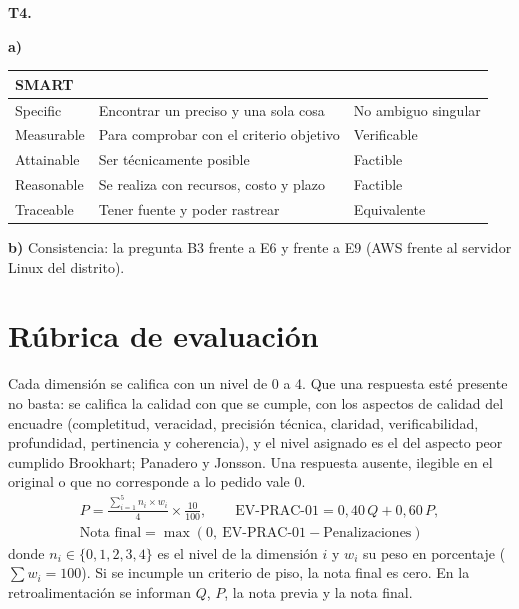 \documentclass[11pt]{article}
\newcommand{\seccion}[1]{\section{\textcolor{utegreendk}{#1}}}
\begin{document}
\begin{cajarespuesta}[title={Respuesta del estudiante: T4 (parte realizada)}]
	\textbf{T4.}
	
	\textbf{a)}
	
	\begin{longtable}{|p{2.5cm}|p{6cm}|p{4cm}|}
		\hline
		SMART & & \\ \hline
		Specific & Encontrar un preciso y una sola cosa & No ambiguo singular\\ \hline
		Measurable & Para comprobar con el criterio objetivo & Verificable\\ \hline
		Attainable & Ser técnicamente posible & Factible\\ \hline
		Reasonable & Se realiza con recursos, costo y plazo & Factible\\ \hline
		Traceable & Tener fuente y poder rastrear & Equivalente\\ \hline
	\end{longtable}
	
	\textbf{b)} Consistencia: la pregunta B3 frente a E6 y frente a E9 (AWS frente al servidor Linux del distrito).
\end{cajarespuesta}

	\seccion{Rúbrica de evaluación}
	
	Cada dimensión se califica con un nivel de 0 a 4. Que una respuesta esté presente no basta: se califica la calidad con que se cumple, con los aspectos de calidad del encuadre (completitud, veracidad, precisión técnica, claridad, verificabilidad, profundidad, pertinencia y coherencia), y el nivel asignado es el del aspecto peor cumplido Brookhart; Panadero y Jonsson. Una respuesta ausente, ilegible en el original o que no corresponde a lo pedido vale 0.
	\begin{gather*}
		P = \frac{\sum_{i=1}^{5} n_i \times w_i}{4} \times \frac{10}{100}, \qquad \text{EV-PRAC-01} = 0{,}40\,Q + 0{,}60\,P,\\
		\text{Nota final} = \max(0,\ \text{EV-PRAC-01} - \text{Penalizaciones})
	\end{gather*}
	donde $n_i \in \{0,1,2,3,4\}$ es el nivel de la dimensión $i$ y $w_i$ su peso en porcentaje ($\sum w_i = 100$). Si se incumple un criterio de piso, la nota final es cero. En la retroalimentación se informan $Q$, $P$, la nota previa y la nota final.
	
\end{document}
